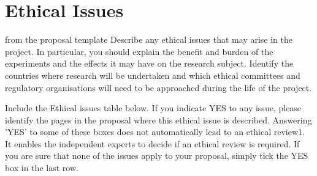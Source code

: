 \chapter{Ethical Issues}\label{chap:ethical}
\begin{todo}{from the proposal template}
  Describe any ethical issues that may arise in the project. In particular, you should
  explain the benefit and burden of the experiments and the effects it may have on the
  research subject. Identify the countries where research will be undertaken and which
  ethical committees and regulatory organisations will need to be approached during the
  life of the project.

  Include the Ethical issues table below.  If you indicate YES to any issue, please
  identify the pages in the proposal where this ethical issue is described. Answering
  'YES' to some of these boxes does not automatically lead to an ethical review1.  It
  enables the independent experts to decide if an ethical review is required. If you are
  sure that none of the issues apply to your proposal, simply tick the YES box in the last
  row.
\end{todo}

